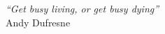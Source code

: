 \cleardoublepage
\thispagestyle{plain}

\vspace*{8cm}

\begin{flushright}
   \textsl{``Get busy living, or get busy dying''} \\
\vspace*{1.5cm}
    Andy Dufresne
\end{flushright}
